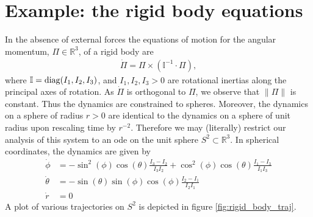 \documentclass[a4paper, 12 pt]{amsart}
\newcommand{\R}{\mathbb{R}}
\begin{document}
%
%
%
%

\section{Example: the rigid body equations}
In the absence of external forces
the equations of motion for the angular momentum, $\Pi \in \R^3$,
of a rigid body are
\begin{align}
  \dot{\Pi} = \Pi \times ( \mathbb{I}^{-1}\cdot \Pi),  \label{eq:rigid_body}
\end{align}
where $\mathbb{I} = {\rm diag}(I_1,I_2,I_3)$,
and $I_1,I_2,I_3 > 0$ are rotational inertias along
the principal axes of rotation.
As $\dot{\Pi}$ is orthogonal to $\Pi$, we observe that
$\| \Pi \|$ is constant.  Thus the dynamics are constrained
to spheres.  Moreover, the dynamics on a sphere of radius $r>0$
are identical to the dynamics on a sphere of unit radius
upon rescaling time by $r^{-2}$.
Therefore we may (literally) restrict our analysis of this system
to an ode on the unit sphere $S^2 \subset \R^3$.
In spherical coordinates, the dynamics are given by
\begin{align*}
  \dot{\phi} &= -\sin^2(\phi) \cos(\theta) \frac{I_3-I_2}{I_3I_2}
  + \cos^2(\phi) \cos(\theta) \frac{I_1 - I_3}{I_1 I_3} \\
  \dot{\theta} &= - \sin(\theta) \sin(\phi) \cos(\phi) \frac{I_2 - I_1}{I_2I_1} \\
  \dot{r} &= 0
\end{align*}
A plot of various trajectories on $S^2$ is depicted in figure \ref{fig:rigid_body_traj}.
\end{document}
